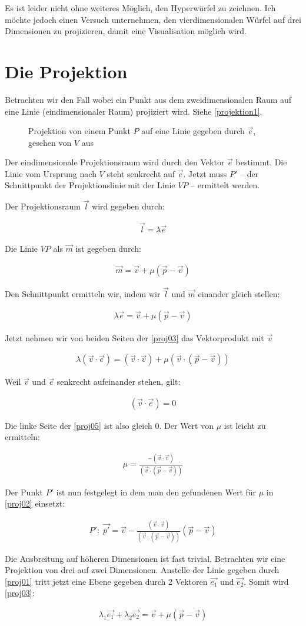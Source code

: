 \documentclass[10pt,a4paper,twoside,titlepage]{article}
\newcommand{\myeq}[2]{
	\begin{equation}
		\begin{split}
			#1
		\end{split}
		\label{#2}
	\end{equation}
}
\newcommand{\psimg}[3]{
    \begin{figure}[!ht]
        \centering
        
        \caption{#2}
        #3
    \end{figure}
}
\begin{document}
Es ist leider nicht ohne weiteres Möglich, den Hyperwürfel zu zeichnen.
Ich möchte jedoch einen Versuch unternehmen, den vierdimensionalen Würfel
auf drei Dimensionen zu projizieren, damit eine Visualisation möglich wird.

\section{Die Projektion}
Betrachten wir den Fall wobei ein Punkt aus dem zweidimensionalen
Raum auf eine Linie (eindimensionaler Raum) projiziert wird.
Siehe \autoref{projektion1}.
    
\psimg{img/Projektion.tex}{Projektion von einem Punkt $P$ auf 
    eine Linie gegeben durch $\vec{e}$, gesehen von $V$ aus}
{\label{projektion1}}
	
Der eindimensionale Projektionsraum wird durch den Vektor
$\vec{e}$ bestimmt. Die Linie vom Ursprung nach $V$ steht 
senkrecht auf $\vec{e}$.
Jetzt muss $P'$ -- der Schnittpunkt der
Projektionslinie mit der Linie $VP$ -- ermittelt werden.

Der Projektionsraum $\vec{l}$ wird gegeben durch:
\myeq{\vec{l}=\lambda \vec{e}}{proj01}

Die Linie $VP$ als $\vec{m}$ ist gegeben durch:
\myeq{\vec{m}=\vec{v} + \mu(\vec{p}-\vec{v})}{proj02}

Den Schnittpunkt ermitteln wir, indem wir $\vec{l}$ und $\vec{m}$
einander gleich stellen:
\myeq{\lambda \vec{e} = \vec{v} + \mu(\vec{p}-\vec{v})}{proj03}


Jetzt nehmen wir von beiden Seiten der \autoref{proj03} das Vektorprodukt
mit $\vec{v}$
\myeq{\lambda(\vec{v}\cdot\vec{e}) = (\vec{v}\cdot\vec{v}) + \mu 
	(\vec{v}\cdot(\vec{p}-\vec{v}))}{proj05}

Weil $\vec{v}$ und $\vec{e}$ senkrecht aufeinander stehen, gilt:
\myeq{(\vec{v}\cdot\vec{e}) = 0}{proj04}

Die linke Seite der \autoref{proj05} ist also gleich 0. Der Wert von
$\mu$ ist leicht zu ermitteln:
\myeq{\mu = \frac{-(\vec{v}\cdot\vec{v})}
	{(\vec{v}\cdot(\vec{p}-\vec{v}))}}{proj06}
	
Der Punkt $P'$ ist nun festgelegt in dem man den gefundenen Wert
für $\mu$ in \autoref{proj02} einsetzt:
\myeq{P':\; \vec{p'} = \vec{v} -  \frac{(\vec{v}\cdot\vec{v})}
	{(\vec{v}\cdot(\vec{p}-\vec{v}))}(\vec{p}-\vec{v})}{proj07}

Die Ausbreitung auf höheren Dimensionen ist fast trivial. Betrachten wir
eine Projektion von drei auf zwei Dimensionen. Anstelle der Linie gegeben durch
\autoref{proj01} tritt jetzt eine Ebene gegeben durch 2 Vektoren
$\vec{e_1}$ und $\vec{e_2}$. Somit wird \autoref{proj03}:
\myeq{
	\lambda_1\vec{e_1} + \lambda_2\vec{e_2} = \vec{v} + \mu(\vec{p}-\vec{v})
}{proj08}
\end{document}
